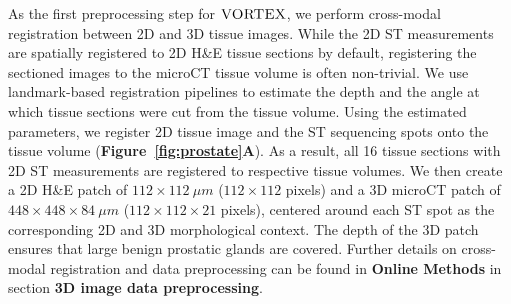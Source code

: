 As the first preprocessing step for $\textsc{VORTEX}$, we perform cross-modal registration between 2D and 3D tissue images. While the 2D ST measurements are spatially registered to 2D H\&E tissue sections by default, registering the sectioned images to the microCT tissue volume is often non-trivial.
We use landmark-based registration pipelines\cite{bay2006surf, fischler1981random, gatenbee2023virtual,chicherova2014histology} to estimate the depth and the angle at which tissue sections were cut from the tissue volume. Using the estimated parameters, we register 2D tissue image and the ST sequencing spots onto the tissue volume (\textbf{Figure~\ref{fig:prostate}A}).
As a result, all 16 tissue sections with 2D ST measurements are registered to respective tissue volumes.
We then create a 2D H\&E patch of $112\times112~\mu m$ ($112\times 112$ pixels) and a 3D microCT patch of $448\times 448 \times 84~\mu m$ ($112 \times 112 \times 21$ pixels), centered around each ST spot as the corresponding 2D and 3D morphological context. The depth of the 3D patch ensures that large benign prostatic glands are covered. Further details on cross-modal registration and data preprocessing can be found in \textbf{Online Methods} in section \textbf{3D image data preprocessing}.

